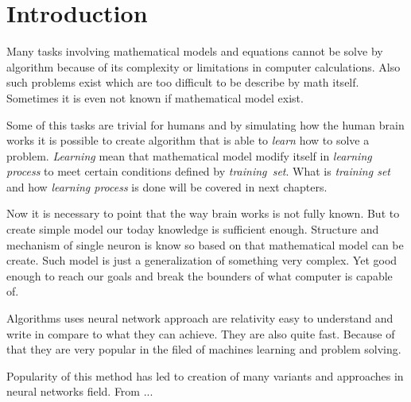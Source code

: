 \section{Introduction}
Many tasks involving mathematical models and equations cannot be solve by algorithm because of its complexity or limitations in computer calculations. Also such problems exist which are too difficult to be describe by math itself. Sometimes it is even not known if mathematical model exist.

Some of this tasks are trivial for humans and by simulating how the human brain works it is possible to create algorithm that is able to \textit{learn} how to solve a problem. \textit{Learning} mean that mathematical model modify itself in \textit{learning process} to meet certain conditions defined by \textit{training~set}. What is \textit{training set} and how \textit{learning process} is done will be covered in next chapters.

Now it is necessary to point that the way brain works is not fully known. But to create simple model our today knowledge is sufficient enough. Structure and mechanism of single neuron is know so based on that mathematical model can be create. Such model is just a generalization of something very complex. Yet good enough to reach our goals and break the bounders of what computer is capable of.

Algorithms uses neural network approach are relativity easy to understand and write in compare to what they can achieve. They are also quite fast. Because of that they are very popular in the filed of machines learning and problem solving.

Popularity of this method has led to creation of many variants and approaches in neural networks field. From ...